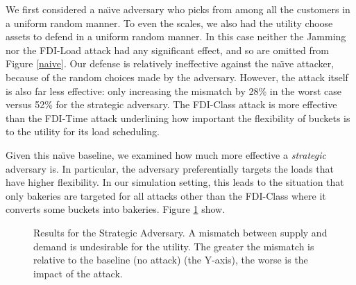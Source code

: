 We first considered a na\"\i ve adversary who picks from among all the customers in a uniform random manner. To even the scales, we also had the utility choose assets to defend in a uniform random manner. In this case neither the Jamming nor the FDI-Load attack had any significant effect, and so are omitted from Figure \ref{naive}. Our defense is relatively ineffective against the na\"\i ve attacker, because of the random choices made by the adversary. However, the attack itself is also far less effective: only increasing the mismatch by 28\% in the worst case versus 52\% for the strategic adversary. The FDI-Class attack is more effective than the FDI-Time attack underlining how important the flexibility of buckets is to the utility for its load scheduling. 

Given this na\"\i ve baseline, we examined how much more effective a \emph{strategic} adversary is. In particular, the adversary preferentially targets the loads that have higher flexibility. In our simulation setting, this leads to the situation that only bakeries are targeted for all attacks other than the FDI-Class where it converts some buckets into bakeries. Figure \ref{strategic} show.

\begin{figure}[htp]
    \centering
    \hfill
    \caption{Results for the Strategic Adversary. A mismatch between supply and demand is undesirable for the utility. The greater the mismatch is relative to the baseline (no attack) (the Y-axis), the worse is the impact of the attack.}

    \label{strategic}  
\end{figure}

